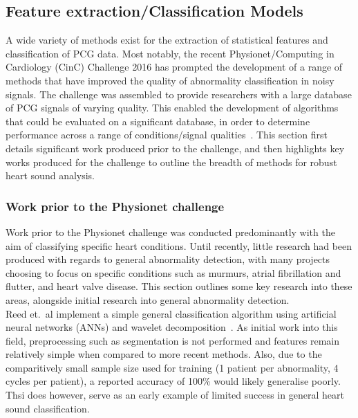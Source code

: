\documentclass[titlepage, 12pt]{scrartcl} \usepackage{enumitem}
\begin{document}
\doublespacing

\subsection{Feature extraction/Classification Models}\label{Classification}

A wide variety of methods exist for the extraction of statistical features and
classification of PCG data. Most notably, the recent Physionet/Computing in
Cardiology (CinC) Challenge 2016 has prompted the development of a range of methods
that have improved the quality of abnormality classification in noisy signals.
The challenge was assembled to provide researchers with a large database of PCG
signals of varying quality. This enabled the development of algorithms that
could be evaluated on a significant database, in order to determine performance
across a range of conditions/signal qualities~\parencite{Clifford2016}. This
section first details significant work produced prior to the challenge, and
then highlights key works produced for the challenge to outline the breadth of
methods for robust heart sound analysis.

\subsubsection{Work prior to the Physionet challenge}
Work prior to the Physionet challenge was conducted predominantly with the aim
of classifying specific heart conditions. Until recently, little research had
been produced with regards to general abnormality detection, with many projects
choosing to focus on specific conditions such as murmurs, atrial fibrillation
and flutter, and heart valve disease. This section outlines some key research
into these areas, alongside initial research into general abnormality
detection.\\

Reed et.\ al implement a simple general classification algorithm using artificial
neural networks (ANNs) and wavelet decomposition~\citeyearpar{Reed2004}. As
initial work into this field, preprocessing such as segmentation is not
performed and features remain relatively simple when compared to more recent
methods. Also, due to the comparitively small sample size used for training (1
patient per abnormality, 4 cycles per patient), a reported accuracy of 100\%
would likely generalise poorly. Thsi does however, serve as an early example of
limited success in general heart sound classification.\\
\end{document}
